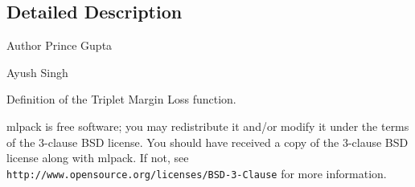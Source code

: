 \subsection{Detailed Description}
\begin{DoxyAuthor}{Author}
Prince Gupta 

Ayush Singh
\end{DoxyAuthor}
Definition of the Triplet Margin Loss function.

mlpack is free software; you may redistribute it and/or modify it under the terms of the 3-\/clause B\+SD license. You should have received a copy of the 3-\/clause B\+SD license along with mlpack. If not, see {\tt http\+://www.\+opensource.\+org/licenses/\+B\+S\+D-\/3-\/\+Clause} for more information. 